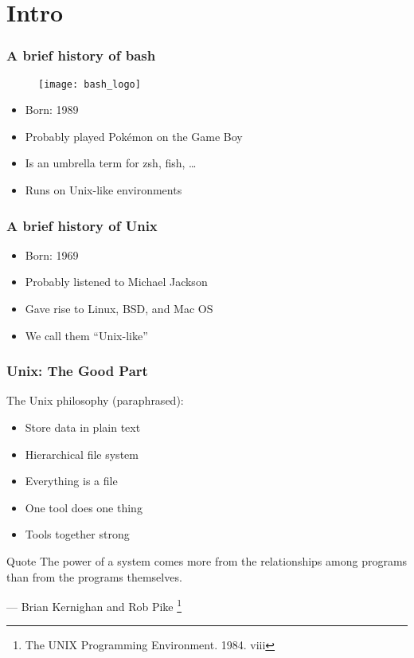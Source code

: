 \section{Intro}
\begin{frame}
\frametitle{A brief history of bash}
\begin{figure}[h]
    \centering
    \texttt{[image: bash\_logo]}
\end{figure}
\begin{itemize}
    \item Born: 1989
    \item Probably played Pokémon on the Game Boy
    \item Is an umbrella term for zsh, fish, …
    \item Runs on Unix-like environments
\end{itemize}
\end{frame}

\begin{frame}
\frametitle{A brief history of Unix}
\begin{itemize}
    \item Born: 1969
    \item Probably listened to Michael Jackson
    \item Gave rise to Linux, BSD, and Mac OS
    \item We call them ``Unix-like''
\end{itemize}
\end{frame}

\begin{frame}
\frametitle{Unix: The Good Part}
The Unix philosophy (paraphrased):
\begin{itemize}
    \item Store data in plain text
    \item Hierarchical file system
    \item Everything is a file
    \item One tool does one thing
    \item Tools together strong
\end{itemize}
\begin{block}{Quote}
The power of a system comes more from the relationships among programs than
from the programs themselves.
\begin{flushright}
    — Brian Kernighan and Rob Pike
    \footnote{The UNIX Programming Environment. 1984. viii}
\end{flushright}
\end{block}
\end{frame}

